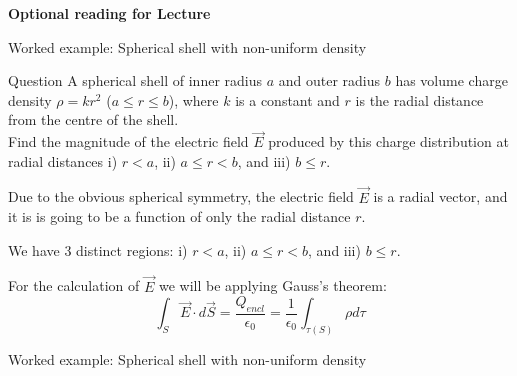 %
%

\begin{frame}[plain,c]
\begin{center}
{\Huge \bf Optional reading for Lecture \thislecture}
\end{center}
\end{frame}


%
%

{
\problemslide

\begin{frame}{Worked example: Spherical shell with non-uniform density}

  \begin{blockexmplque}{Question}
    A spherical shell of inner radius $a$ and outer radius $b$ has volume charge
    density $\rho = kr^2$ ($a \le r \le b$), where $k$ is a constant and $r$ is
    the radial distance from the centre of the shell.\\
    Find the magnitude of the electric field $\vec{E}$
    produced by this charge distribution
    at radial distances i) $r<a$, ii) $a \le r < b$, and iii) $b \le r$.
  \end{blockexmplque}

  \vspace{0.2cm}

  Due to the obvious spherical symmetry, the electric field $\vec{E}$
  is a radial vector, and it is
  is going to be a function of only the radial distance $r$.\\

  \vspace{0.2cm}

  We have 3 distinct regions:
  i) $r<a$, ii) $a \le r < b$, and iii) $b \le r$.
  \vspace{0.2cm}

  For the calculation of $\vec{E}$ we will be applying Gauss's theorem:
  \begin{equation*}
    \int_{S} \vec{E} \cdot d\vec{S} =
      \frac{Q_{encl}}{\epsilon_0} =
        \frac{1}{\epsilon_0} \int_{\tau(S)} \rho d\tau
  \end{equation*}

\end{frame}

%
%
%

\begin{frame}{Worked example: Spherical shell with non-uniform density}


\end{frame}}
